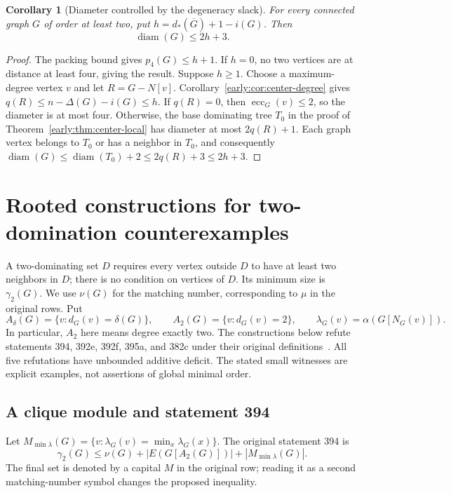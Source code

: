 \documentclass[11pt,a4paper]{article}
\newtheorem{corollary}[theorem]{Corollary}
\theoremstyle{definition}\newtheorem{definition}[theorem]{Definition}
\theoremstyle{remark}\newtheorem{remark}[theorem]{Remark}
\begin{document}
\begin{corollary}[Diameter controlled by the degeneracy slack]
For every connected graph $G$ of order at least two, put
$h=d_*(\overline G)+1-i(G)$. Then
\[
 \operatorname{diam}(G)\leq 2h+3.
\]
\end{corollary}
\begin{proof}
The packing bound gives $p_4(G)\leq h+1$. If $h=0$, no two vertices
are at distance at least four, giving the result. Suppose $h\geq1$.
Choose a maximum-degree vertex $v$ and let $R=G-N[v]$.
Corollary~\ref{early:cor:center-degree} gives
$q(R)\leq n-\Delta(G)-i(G)\leq h$.
If $q(R)=0$, then $\operatorname{ecc}_G(v)\leq2$, so the diameter
is at most four. Otherwise, the base dominating tree $T_0$ in the proof of Theorem~\ref{early:thm:center-local}
has diameter at most $2q(R)+1$. Each graph vertex belongs to $T_0$ or
has a neighbor in $T_0$, and consequently
$\operatorname{diam}(G)\leq\operatorname{diam}(T_0)+2
\leq2q(R)+3\leq2h+3$.
\end{proof}

\section{Rooted constructions for two-domination counterexamples}
\label{early:sec:two-domination}

A two-dominating set $D$ requires every vertex outside $D$ to have at
least two neighbors in $D$; there is no condition on vertices of $D$.
Its minimum size is $\gamma_2(G)$.  We use $\nu(G)$ for the matching
number, corresponding to $\mu$ in the original rows.  Put
\[
 A_\delta(G)=\{v:d_G(v)=\delta(G)\},\qquad
 A_2(G)=\{v:d_G(v)=2\},\qquad
 \lambda_G(v)=\alpha(G[N_G(v)]).
\]
In particular, $A_2$ here means degree exactly two.  The constructions
below refute statements 394, 392e, 392f, 395a, and 382c under their
original definitions~\cite{src:catalogue,early:glossary,early:dpw-two}.
All five refutations have unbounded additive deficit.  The stated small
witnesses are explicit examples, not assertions of global minimal order.

\subsection{A clique module and statement 394}

Let
$M_{\min\lambda}(G)=\{v:\lambda_G(v)=\min_x\lambda_G(x)\}$.
The original statement 394 is
\begin{equation}
 \gamma_2(G)\leq \nu(G)+|E(G[A_2(G)])|+|M_{\min\lambda}(G)|.
 \label{early:eq:394-original}
\end{equation}
The final set is denoted by a capital $M$ in the original row; reading
it as a second matching-number symbol changes the proposed inequality.
\end{document}
